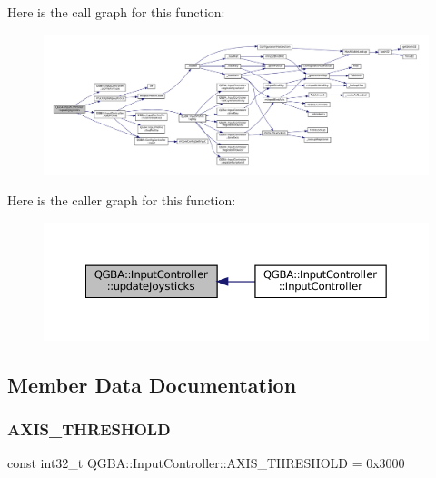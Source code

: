 Here is the call graph for this function\+:
\nopagebreak
\begin{figure}[H]
\begin{center}
\leavevmode
\includegraphics[width=350pt]{class_q_g_b_a_1_1_input_controller_aa8a9042a903f7e1204b1207ecdcb0f73_cgraph}
\end{center}
\end{figure}
Here is the caller graph for this function\+:
\nopagebreak
\begin{figure}[H]
\begin{center}
\leavevmode
\includegraphics[width=350pt]{class_q_g_b_a_1_1_input_controller_aa8a9042a903f7e1204b1207ecdcb0f73_icgraph}
\end{center}
\end{figure}


\subsection{Member Data Documentation}
\mbox{\label{class_q_g_b_a_1_1_input_controller_af8d8296d311a345f44171e3e2023999c}} 
\subsubsection{\texorpdfstring{A\+X\+I\+S\+\_\+\+T\+H\+R\+E\+S\+H\+O\+LD}{AXIS\_THRESHOLD}}
{\footnotesize\ttfamily const int32\+\_\+t Q\+G\+B\+A\+::\+Input\+Controller\+::\+A\+X\+I\+S\+\_\+\+T\+H\+R\+E\+S\+H\+O\+LD = 0x3000\hspace{0.3cm}{\ttfamily [static]}}

